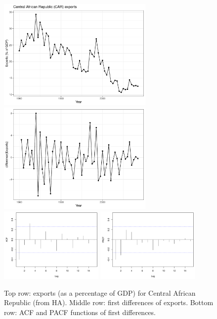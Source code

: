\documentclass{article}
\begin{document}
\begin{itemize}
\begin{figure}[p]
\centering
\includegraphics[width=0.675\textwidth]{fig/car-1.pdf}
\includegraphics[width=0.675\textwidth]{fig/car-2.pdf}
\includegraphics[width=0.45\textwidth]{fig/car-3.pdf}
\includegraphics[width=0.45\textwidth]{fig/car-4.pdf}
\caption{Top row: exports (as a percentage of GDP) for Central African
  Republic (from HA). Middle row: first differences of exports. Bottom row: ACF 
  and PACF functions of first differences.}
\label{fig:car_exploratory}
\end{figure}


\end{itemize}
\end{document}

